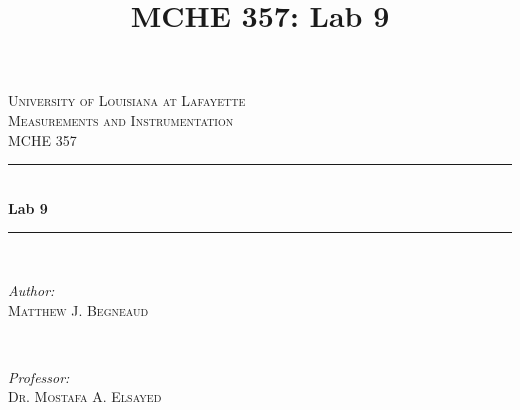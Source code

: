 \documentclass[12pt]{article}
\title{MCHE 357: Lab 9}
\begin{document}




\begin{titlepage}

\newcommand{\HRule}{\rule{\linewidth}{0.5mm}} %

\center %
 

\textsc{\LARGE University of Louisiana at Lafayette}\\[1.5cm] %
\textsc{\Large Measurements and Instrumentation}\\[0.5cm] %
\textsc{\large MCHE 357}\\[0.5cm] %


\HRule \\[0.4cm]
{ \huge \bfseries Lab 9}\\[0.4cm] %
\HRule \\[1.5cm]
 

\begin{minipage}{0.4\textwidth}
\begin{flushleft} \large
\emph{Author:}\\
\textsc{Matthew J. Begneaud} \\%
\end{flushleft}
\end{minipage}
~
\begin{minipage}{0.4\textwidth}
\begin{flushright} \large
\emph{Professor:} \\
\textsc{Dr. Mostafa A. Elsayed} %
\end{flushright}
\end{minipage}\\[1.5cm]


\end{titlepage}
\end{document}
